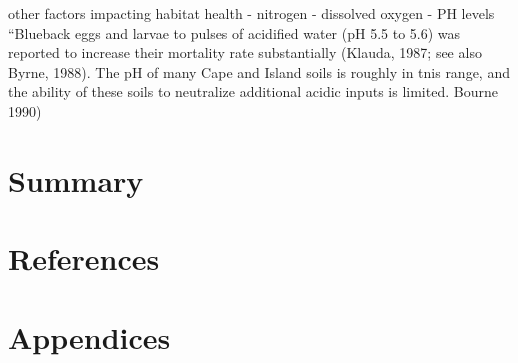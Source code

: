 \documentclass[
]{book}
\begin{document}
other factors impacting habitat health
- nitrogen
- dissolved oxygen
- PH levels
``Blueback eggs and larvae to pulses of acidified water
(pH 5.5 to 5.6) was reported to increase their
mortality rate substantially (Klauda, 1987; see also
Byrne, 1988). The pH of many Cape and Island soils is
roughly in tnis range, and the ability of these soils
to neutralize additional acidic inputs is limited. Bourne 1990)

\hypertarget{summary}{%
\chapter{Summary}\label{summary}}

\hypertarget{references}{%
\chapter*{References}\label{references}}

\hypertarget{appendices}{%
\chapter*{Appendices}\label{appendices}}
\end{document}
